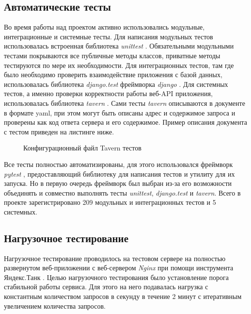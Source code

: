     \subsection{Автоматические тесты}
    Во время работы над проектом активно использовались модульные,
    интеграционные и системные тесты. \cite{test.kulikov}
    Для написания модульных тестов использовалась
    встроенная библиотека \textit{unittest} \cite{test.unittest}.
    Обязательными модульными тестами покрываются все публичные методы классов,
    приватные методы тестируются по мере их необходимости.
    Для интеграционных тестов,
    там где было необходимо проверить взаимодействие приложения с базой данных,
    использовалась библиотека \textit{django.test} фреймворка \textit{django}
    \cite{docs.django}.
    Для системных тестов, а именно проверки корректности работы веб-API
    приложения, использовалась библиотека \textit{tavern} \cite{test.tavern}.
    Сами тесты \textit{tavern} описываются в документе в формате yaml, при этом
    могут быть описаны адрес и содержимое запроса и
    проверены как код ответа сервера и его содержимое.
    Пример описания документа с тестом приведен на листинге ниже.
    \begin{figure}[H]
        \centering
        
        \caption{Конфигурационный файл Tavern тестов}
        \label{fig:tavern-tests}
    \end{figure}

    Все тесты полностью автоматизированы, для этого использовался
    фреймворк \textit{pytest} \cite{test.pytest},
    предоставляющий библиотеку для написания тестов и
    утилиту для их запуска. Но в первую очередь фреймворк был выбран из-за его
    возможности объединять и совместно выполнять тесты
    \textit{unittest}, \textit{django.test} и \textit{tavern}.
    Всего в проекте зарегистрировано 209 модульных и интеграционных тестов и
    5 системных.

    \subsection{Нагрузочное тестирование}
    Нагрузочное тестирование проводилось на тестовом сервере на полностью
    развернутом веб-приложении с веб-сервером \textit{Nginx} при помощи
    инструмента Яндекс.Танк \cite{test.yandex.tank}.
    Целью нагрузочного тестирования было установление
    порога стабильной работы сервиса. Для этого на него подавалась нагрузка
    с константным количеством запросов в секунду в течение 2 минут с итеративным
    увеличением количества запросов.

